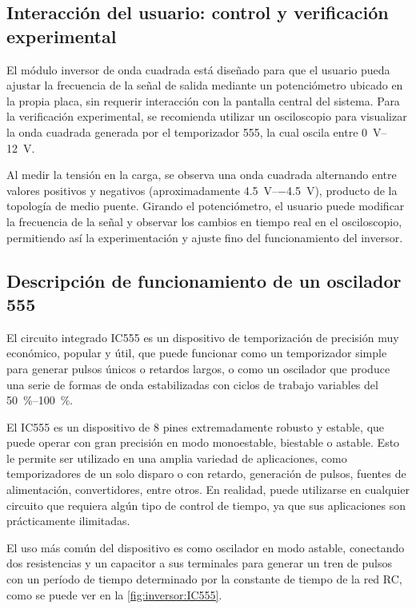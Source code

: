 \subsection{Interacción del usuario: control y verificación experimental}

El módulo inversor de onda cuadrada está diseñado para que el usuario pueda ajustar la frecuencia de la señal de salida mediante un potenciómetro ubicado en la propia placa, sin requerir interacción con la pantalla central del sistema. Para la verificación experimental, se recomienda utilizar un osciloscopio para visualizar la onda cuadrada generada por el temporizador 555, la cual oscila entre \SIrange{0}{12}{V}. 

Al medir la tensión en la carga, se observa una onda cuadrada alternando entre valores positivos y negativos (aproximadamente \SIrange{+4.5}{-4.5}{V}), producto de la topología de medio puente. Girando el potenciómetro, el usuario puede modificar la frecuencia de la señal y observar los cambios en tiempo real en el osciloscopio, permitiendo así la experimentación y ajuste fino del funcionamiento del inversor.

\subsection{Descripción de funcionamiento de un oscilador 555}

El circuito integrado IC555 es un dispositivo de temporización de precisión muy económico, popular y útil, que puede funcionar como un temporizador simple para generar pulsos únicos o retardos largos, o como un oscilador que produce una serie de formas de onda estabilizadas con ciclos de trabajo variables del \SIrange{50}{100}{\percent}.

El IC555 es un dispositivo de 8 pines extremadamente robusto y estable, que puede operar con gran precisión en modo monoestable, biestable o astable. Esto le permite ser utilizado en una amplia variedad de aplicaciones, como temporizadores de un solo disparo o con retardo, generación de pulsos, fuentes de alimentación, convertidores, entre otros. En realidad, puede utilizarse en cualquier circuito que requiera algún tipo de control de tiempo, ya que sus aplicaciones son prácticamente ilimitadas.

El uso más común del dispositivo es como oscilador en modo astable, conectando dos resistencias y un capacitor a sus terminales para generar un tren de pulsos con un período de tiempo determinado por la constante de tiempo de la red RC, como se puede ver en la \cref{fig:inversor:IC555}.

